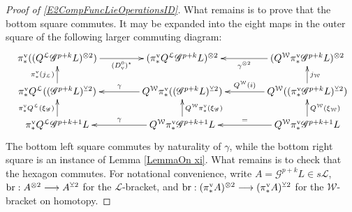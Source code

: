 \documentclass[11pt]{amsart} \renewcommand{\baselinestretch}{1.4}
\theoremstyle{plain}
\theoremstyle{definition}
\renewcommand{\to}{\longrightarrow}
\newcommand{\scrG}{\mathscr{G}}
\newcommand{\calL}{\mathcal{L}}
\newcommand{\calw}{\mathcal{W}}
\newcommand{\call}{\mathcal{L}}
\newcommand{\BSW}{{\scrG}}
\newcommand{\uver}{^\mathrm{v}}
\newcommand{\dver}{_\mathrm{v}}
\newcommand{\smashcoprod}{\veebar}%
\begin{document}
\begin{Operations in composite functor spectral sequences}
\begin{proof}[Proof of \ref{E2CompFuncLieOperationsID}]
What remains is to prove that the bottom square commutes. It may be expanded into the eight maps in the outer square of the following larger commuting diagram:
\[
\xymatrix@R=6mm@C=15mm@!0{
&%
\pi\uver_*((Q^{\calL}\BSW^{p+k}L)^{\otimes2}) \ar[rrr]_-{(D\dver^0)^\star}
&%
&%
&%
(\pi\uver_* Q^{\calL}\BSW^{p+k}L)^{\otimes2}&%
&%
&%
(Q^{\calw}\pi\uver_*\BSW^{p+k}L)^{\otimes2} \ar[lll]^-{\gamma^{\otimes2}}\\\\%
&%
\pi\uver_* Q^{\calL}((\BSW^{p+k}L)^{\smashcoprod 2})\ar[uu]^-{\pi\uver_*(j_{\calL})}
&%
&%
&%
Q^{\calw}\pi\uver_*((\BSW^{p+k}L)^{\smashcoprod 2})\ar[lll]_-{\gamma}
&%
&%
&%
Q^{\calw}((\pi\uver_* \BSW^{p+k}L)^{\smashcoprod 2})
\ar[uu]_-{j_{\calw}}
\ar[lll]_-{Q^{\calw}(i)}
\\\\
&%
\pi\uver_* Q^{\calL}\BSW^{p+k+1}L
\ar[uu]^-{\pi\uver_* Q^{\calL}(\xi_{\BSW})}
&%
&%
&%
Q^{\calw}\pi\uver_*\BSW^{p+k+1}L\ar[lll]_-{\gamma}
\ar[uu]_-{Q^{\calw}\pi\uver_*(\xi_{\BSW})}
&%
&%
&%
Q^{\calw}\pi\uver_* \BSW^{p+k+1}L
\ar[uu]_-{Q^{\calw}(\xi_{\calw})}
\ar[lll]_-{=}
}\]
The bottom left square commutes by naturality of $\gamma$, while the bottom right square is an instance of Lemma \ref{LemmaOn xi}. What remains is to check that the hexagon commutes. For notational convenience, write $A=\BSW^{p+k}L\in s\calL$, $\textup{br}:A^{\otimes 2}\to A^{\smashcoprod 2}$ for the $\call$-bracket, and
$\textup{br}:(\pi\uver_* A)^{\otimes 2}\to (\pi\uver_* A)^{\smashcoprod 2}$ for the $\calw$-bracket on homotopy.


\end{proof}
\end{Operations in composite functor spectral sequences}
\end{document}
